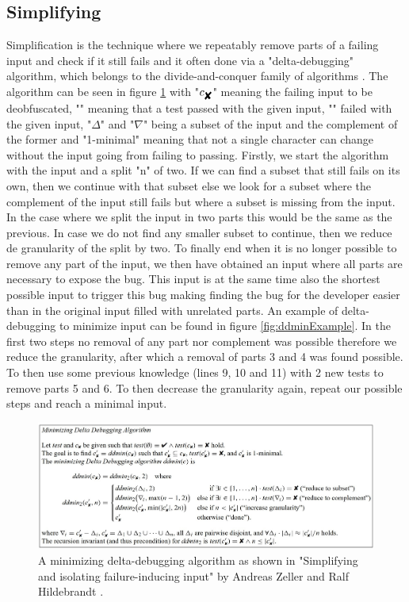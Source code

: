 \subsection{Simplifying}
\label{inputReduction:Simplifying}
Simplification is the technique where we repeatably remove parts of a failing input and check if it still fails and it often done via a "delta-debugging" algorithm, which belongs to the divide-and-conquer family of algorithms \cite{2FuzzingAndDeltaDebuggingSMTSolvers}. 
The algorithm can be seen in figure \ref{fig:ddmin} with 
"$ c_{\mbox{\ding{56}}} $"  %
meaning the failing input to be deobfuscated,
"" %
meaning that a test passed with the given input,
"" %
failed with the given input, 
"$\Delta$" and "$\nabla$" being a subset of the input and the complement of the former and
"1-minimal" meaning that not a single character can change without the input going from failing to passing. Firstly, we start the algorithm with the input and a split "n" of two. If we can find a subset that still fails on its own, then we continue with that subset else we look for a subset where the complement of the input still fails but where a subset is missing from the input. In the case where we split the input in two parts this would be the same as the previous. In case we do not find any smaller subset to continue, then we reduce de granularity of the split by two. To finally end when it is no longer possible to remove any part of the input, we then have obtained an input where all parts are necessary to expose the bug. This input is at the same time also the shortest possible input to trigger this bug making finding the bug for the developer easier than in the original input filled with unrelated parts. 
An example of delta-debugging to minimize input can be found in figure \ref{fig:ddminExample}. In the first two steps no removal of any part nor complement was possible therefore we reduce the granularity, after which a removal of parts 3 and 4 was found possible. To then use some previous knowledge (lines 9, 10 and 11) with 2 new tests to remove parts 5 and 6. To then decrease the granularity again, repeat our possible steps and reach a minimal input.

\begin{figure}
	\centering
	\includegraphics[width=1.0\textwidth]{images/ddminFromPaper5edit}
	\caption{A minimizing delta-debugging algorithm as shown in "Simplifying and isolating failure-inducing input" by Andreas Zeller and Ralf Hildebrandt \cite{5zeller2002simplifyingIsolatingFailure-inducing}.}
	\label{fig:ddmin}
\end{figure}

